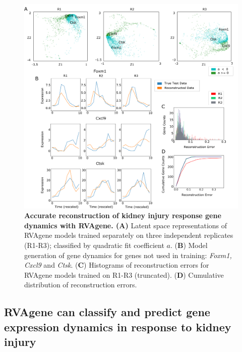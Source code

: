 

{\centering
\begin{figure}
  \includegraphics[width = \linewidth]{figures/quad_jci.png}
    \caption[Accurate reconstruction of kidney injury response gene dynamics with RVAgene.]{{\bf Accurate reconstruction of kidney injury response gene dynamics with RVAgene. (A)} Latent space representations of RVAgene models trained separately on three independent replicates (R1-R3); classified by quadratic fit coefficient $a$. ({\bf B}) Model generation of gene dynamics for genes not used in training: {\em Foxm1, Cxcl9} and {\em Ctsk}. ({\bf C}) Histograms of reconstruction errors for RVAgene models trained on R1-R3 (truncated). ({\bf D}) Cumulative distribution of reconstruction errors. }
  \label{fig:fig6a}
\end{figure}
}



\subsection{RVAgene can classify and predict gene expression dynamics in response to kidney injury}

